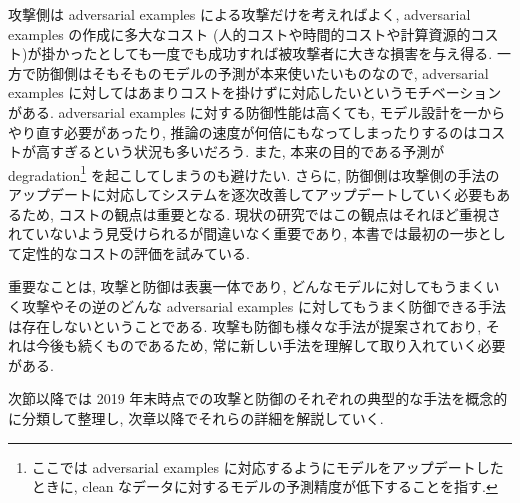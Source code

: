 攻撃側は adversarial examples による攻撃だけを考えればよく, adversarial examples の作成に多大なコスト (人的コストや時間的コストや計算資源的コスト)が掛かったとしても一度でも成功すれば被攻撃者に大きな損害を与え得る.
一方で防御側はそもそものモデルの予測が本来使いたいものなので, adversarial examples に対してはあまりコストを掛けずに対応したいというモチベーションがある.
adversarial examples に対する防御性能は高くても, モデル設計を一からやり直す必要があったり, 推論の速度が何倍にもなってしまったりするのはコストが高すぎるという状況も多いだろう.
また, 本来の目的である予測が degradation\footnote{ここでは adversarial examples に対応するようにモデルをアップデートしたときに, clean なデータに対するモデルの予測精度が低下することを指す.} を起こしてしまうのも避けたい.
さらに, 防御側は攻撃側の手法のアップデートに対応してシステムを逐次改善してアップデートしていく必要もあるため, コストの観点は重要となる.
現状の研究ではこの観点はそれほど重視されていないよう見受けられるが間違いなく重要であり, 本書では最初の一歩として定性的なコストの評価を試みている.

重要なことは, 攻撃と防御は表裏一体であり, どんなモデルに対してもうまくいく攻撃やその逆のどんな adversarial examples に対してもうまく防御できる手法は存在しないということである.
攻撃も防御も様々な手法が提案されており, それは今後も続くものであるため, 常に新しい手法を理解して取り入れていく必要がある.

次節以降では 2019 年末時点での攻撃と防御のそれぞれの典型的な手法を概念的に分類して整理し, 次章以降でそれらの詳細を解説していく.



